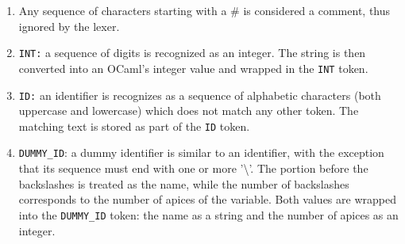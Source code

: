 \documentclass[parskip=half]{scrartcl}
\begin{document}
\begin{enumerate}
  \item Any sequence of characters starting with a \# is considered a comment, thus ignored by the lexer.
  
  \item \texttt{INT:} a sequence of digits is recognized as an integer. 
  The string is then converted into an OCaml's integer value and wrapped in the \texttt{INT} token.
      

  \item \texttt{ID:} an identifier is recognizes as a sequence of alphabetic characters (both uppercase and lowercase) which does not match any other token. 
        The matching text is stored as part of the \texttt{ID} token.
  
  \item \texttt{DUMMY\_ID}: a dummy identifier is similar to an identifier, with the exception that
        its sequence must end with one or more '\textbackslash{}'.
        The portion before the backslashes is treated as the name, while the number of backslashes corresponds to the number of apices of the variable.
        Both values are wrapped into the \texttt{DUMMY\_ID} token: the name as a string and the number of apices as an integer.
\end{enumerate}
\end{document}
